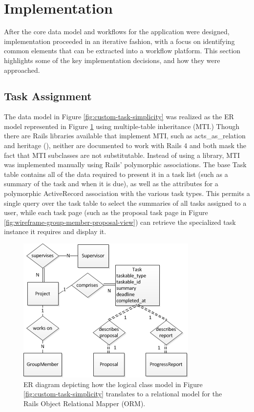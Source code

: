 \documentclass[document.tex]{subfiles}
\begin{document}
\section{Implementation}
\label{sec:4ys-implementation}

After the core data model and workflows for the application were designed, implementation proceeded in an iterative fashion, with a focus on identifying common elements that can be extracted into a workflow platform. This section highlights some of the key implementation decisions, and how they were approached.


\subsection{Task Assignment}
The data model in Figure \ref{fig:custom-task-simplicity} was realized as the ER model represented in Figure \ref{fig:custom-task-er-model} using multiple-table inheritance (MTI.) Though there are Rails libraries available that implement MTI, such as acts\_as\_relation and heritage (), neither are documented to work with Rails 4 and both mask the fact that MTI subclasses are not substitutable. Instead of using a library, MTI was implemented manually using Rails’ polymorphic associations. The base Task table contains all of the data required to present it in a task list (such as a summary of the task and when it is due), as well as the attributes for a polymorphic ActiveRecord association with the various task types. This permits a single query over the task table to select the summaries of all tasks assigned to a user, while each task page (such as the proposal task page in Figure \ref{fig:wireframe-group-member-proposal-view}) can retrieve the specialized task instance it requires and display it.

\begin{figure}[!htbp]
\centering \includegraphics{./img/case-study-fourth-year-system/task-through-project-er-model}
\caption{ER diagram depicting how the logical class model in Figure \ref{fig:custom-task-simplicity} translates to a relational model for the Rails Object Relational Mapper (ORM).}
\label{fig:custom-task-er-model}
\end{figure}
\end{document}
